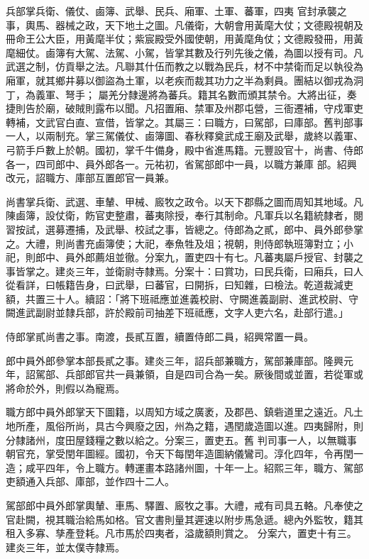 \begin{pinyinscope}
 兵部掌兵衛、儀仗、鹵簿、武舉、民兵、廂軍、土軍、蕃軍，四夷
 官封承襲之事，輿馬、器械之政，天下地土之圖。凡儀衛，大朝會用黃麾大仗；文德殿視朝及冊命王公大臣，用黃麾半仗；紫宸殿受外國使朝，用黃麾角仗；文德殿發冊，用黃麾細仗。鹵簿有大駕、法駕、小駕，皆掌其數及行列先後之儀，為圖以授有司。凡武選之制，仿貢舉之法。凡聯其什伍而教之以戰為民兵，材不中禁衛而足以執役為廂軍，就其鄉井募以御盜為土軍，以老疾而裁其功力之半為剩員。團結以御戎為洞丁，為義軍、弩手；
 屬羌分隸邊將為蕃兵。籍其名數而頒其禁令。大將出征，奏捷則告於廟，破賊則露布以聞。凡招置廂、禁軍及州郡屯營，三衙遷補，守戍軍吏轉補，文武官白直、宣借，皆掌之。其屬三：曰職方，曰駕部，曰庫部。舊判部事一人，以兩制充。掌三駕儀仗、鹵簿圖、春秋釋奠武成王廟及武舉，歲終以義軍、弓箭手戶數上於朝。國初，掌千牛備身，殿中省進馬籍。元豐設官十，尚書、侍郎各一，四司郎中、員外郎各一。元祐初，省駕部郎中一員，以職方兼庫
 部。紹興改元，詔職方、庫部互置郎官一員兼。



 尚書掌兵衛、武選、車輦、甲械、廄牧之政令。以天下郡縣之圖而周知其地域。凡陳鹵簿，設仗衛，飭官吏整肅，蕃夷除授，奉行其制命。凡軍兵以名籍統隸者，閱習按試，選募遷捕，及武舉、校試之事，皆總之。侍郎為之貳，郎中、員外郎參掌之。大禮，則尚書充鹵簿使；大祀，奉魚牲及俎；視朝，則侍郎執班簿對立；小祀，則郎中、員外郎薦俎並徹。分案九，置吏四十有七。凡蕃夷屬戶授官、封襲之
 事皆掌之。建炎三年，並衛尉寺隸焉。分案十：曰賞功，曰民兵衛，曰廂兵，曰人從看詳，曰帳籍告身，曰武舉，曰蕃官，曰開拆，曰知雜，曰檢法。乾道裁減吏額，共置三十人。續詔：「將下班祗應並進義校尉、守闕進義副尉、進武校尉、守闕進武副尉並隸兵部，許於殿前司抽差下班祗應，文字人吏六名，赴部行遣。」



 侍郎掌貳尚書之事。南渡，長貳互置，續置侍郎二員，紹興常置一員。



 郎中員外郎參掌本部長貳之事。建炎三年，詔兵部兼職方，駕部兼庫部。隆興元年，詔駕部、兵部郎官共一員兼領，自是四司合為一矣。厥後間或並置，若從軍或將命於外，則假以為寵焉。



 職方郎中員外郎掌天下圖籍，以周知方域之廣袤，及郡邑、鎮砦道里之遠近。凡土地所產，風俗所尚，具古今興廢之因，州為之籍，遇閏歲造圖以進。四夷歸附，則分隸諸州，度田屋錢糧之數以給之。分案三，置吏五。舊
 判司事一人，以無職事朝官充，掌受閏年圖經。國初，令天下每閏年造圖納儀鸞司。淳化四年，令再閏一造；咸平四年，令上職方。轉運畫本路諸州圖，十年一上。紹熙三年，職方、駕部吏額通入兵部、庫部，並作四十二人。



 駕部郎中員外郎掌輿輦、車馬、驛置、廄牧之事。大禮，戒有司具五輅。凡奉使之官赴闕，視其職治給馬如格。官文書則量其遲速以附步馬急遞。總內外監牧，籍其租入多寡、孳產登耗。凡市馬於四夷者，溢歲額則賞之。
 分案六，置吏十有三。建炎三年，並太僕寺隸焉。




\end{pinyinscope}
